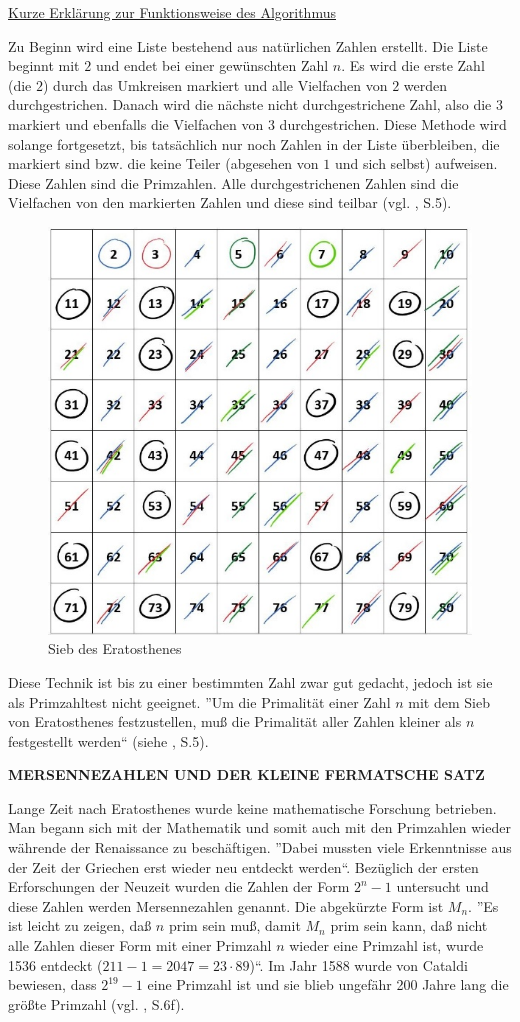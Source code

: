 \underline{Kurze Erklärung zur Funktionsweise des Algorithmus}

Zu Beginn wird eine Liste bestehend aus natürlichen Zahlen
erstellt. Die Liste beginnt mit $2$ und endet bei einer
gewünschten Zahl $n$. Es wird die erste Zahl (die $2$)
durch das Umkreisen markiert und alle Vielfachen von $2$
werden durchgestrichen. Danach wird die nächste nicht
durchgestrichene Zahl, also die $3$ markiert und ebenfalls
die Vielfachen von $3$ durchgestrichen. Diese Methode wird
solange fortgesetzt, bis tatsächlich nur noch Zahlen in der
Liste überbleiben, die markiert sind bzw. die keine Teiler
(abgesehen von $1$ und sich selbst) aufweisen. Diese Zahlen
sind die Primzahlen. Alle durchgestrichenen Zahlen sind die
Vielfachen von den markierten Zahlen und diese sind teilbar
(vgl. \cite{sasgabor}, S.5).

\begin{figure}[H]
  \centering
  \includegraphics[width=.5\linewidth]{./images/sieb.jpg}
  \caption[Das Sieb des Eratosthenes, 2021]{Sieb des Eratosthenes}
  \label{fig:sieb_eratosthenes}
\end{figure}
\vspace{.2cm}

Diese Technik ist bis zu einer bestimmten Zahl zwar gut
gedacht, jedoch ist sie als Primzahltest nicht geeignet.
''Um die Primalität einer Zahl $n$ mit dem Sieb von
Eratosthenes festzustellen, muß die Primalität aller
Zahlen kleiner als $n$ festgestellt werden``
(siehe \cite{sasgabor}, S.5).
\vspace*{.4cm}

\textbf{MERSENNEZAHLEN UND DER KLEINE FERMATSCHE SATZ}

Lange Zeit nach Eratosthenes wurde keine mathematische
Forschung betrieben. Man begann sich mit der Mathematik
und somit auch mit den Primzahlen wieder währende der 
Renaissance zu beschäftigen. ''Dabei mussten viele
Erkenntnisse aus der Zeit der Griechen erst wieder neu
entdeckt werden``. Bezüglich der ersten Erforschungen
der Neuzeit wurden die Zahlen der Form $2^{n}-1$
untersucht und diese Zahlen werden Mersennezahlen genannt.
Die abgekürzte Form ist $M_n$. ''Es ist leicht zu zeigen,
daß $n$ prim sein muß, damit $M_n$ prim sein kann, daß
nicht alle Zahlen dieser Form mit einer Primzahl $n$
wieder eine Primzahl ist, wurde 1536 entdeckt 
($211 - 1 = 2047 = 23 \cdot 89$)``. Im Jahr 1588 wurde von
Cataldi bewiesen, dass $2^{19} - 1$ eine Primzahl ist
und sie blieb ungefähr 200 Jahre lang die größte Primzahl
(vgl. \cite{sasgabor}, S.6f).

